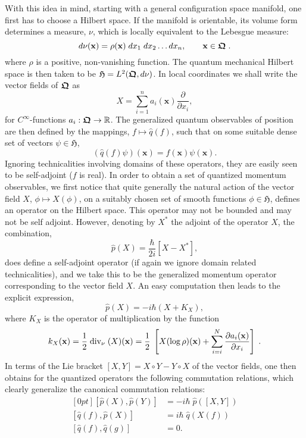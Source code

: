 \documentclass[12pt]{amsart}
\numberwithin{equation}{section}
\theoremstyle{remark}
\newcommand\HH{\mathfrak H}
\newcommand{\be}{\begin{equation}}
\newcommand{\en}{\end{equation}}
\newcommand{\bfrakQ}{\mbox{\boldmath $\mathfrak Q$}}
\newcommand{\bx}{\mathbf x}
\begin{document}
With this idea in mind, starting with a general configuration space manifold,
one first has to choose a Hilbert space. If the manifold is orientable, its
volume form determines a measure, $\nu$, which is locally equivalent to the
Lebesgue measure:
\be
   d\nu (\bx) = \rho (\bx)\; dx_1\;dx_2 \ldots dx_n ,
 \qquad \bx \in \bfrakQ \; . \label{volmeas}
\en
where $\rho$ is a positive, non-vanishing function. The quantum mechanical
Hilbert space is then taken to be $\HH = L^2 (\bfrakQ , d\nu )$.
In local coordinates we shall write the vector fields of $\bfrakQ$ as
$$ X = \sum_{i=1}^{n}a_i(\bx)\frac {\partial}{\partial x_i},   $$
for $C^{\infty}$-functions $a_i: \bfrakQ \rightarrow {\mathbb R}$.
The generalized quantum observables of position
are then defined by the mappings, $f \mapsto \widehat{q}(f)$,
such that on some  suitable dense set of vectors $\psi \in \HH$,
\be
     (\widehat{q}(f)\psi )(\bx) = f(\bx)\psi (\bx).
\label{quposops}
\en
Ignoring technicalities involving domains of these operators, they are easily
seen to be self-adjoint ($f$ is real). In order to obtain a set of quantized
momentum observables, we first notice that quite generally the natural action
of the vector field $X$, $\phi \mapsto X(\phi)$, on a suitably chosen set of
smooth functions $\phi \in \HH$, defines an operator on the Hilbert space. This
operator may not be bounded and may not be self adjoint. However, denoting by
$X^*$ the adjoint of the operator $X$, the combination,
\be
   \widehat{p}(X) = \frac \hbar{2i}[X - X^*],
\label{qumomops}
\en
does define a self-adjoint operator (if again we ignore domain related
technicalities), and we take this to be the generalized momentum operator
corresponding to the vector field $X$. An easy computation then leads to the
explicit expression,
\be
      \widehat{p}(X) = -i\hbar (X + K_{X}),
\label{segalquant1}
\en
where $K_X$ is the operator of multiplication by the function
\be
 k_X (\bx) = \frac 12\;\mbox{\rm div}_{\nu}\;(X)(\bx)
= \frac 12\;\left[X(\log \rho )(\bx) +
      \sum_{i=i}^N \frac {\partial a_i (\bx)}{\partial x_i}\right]\;.
  \label{segalquant2}
\en
In terms of the Lie bracket $[X,Y] = X\circ Y - Y\circ X$ of
the vector fields, one then obtains for the quantized operators the following
commutation relations, which clearly generalize the canonical commutation
relations:
\be \begin{aligned}[0pt]
[\widehat{p}(X), \widehat{p}(Y)]  &=  -i\hbar\; \widehat{p}([X,Y]) \\
[\widehat{q}(f), \widehat{p}(X)]  &=  i\hbar\; \widehat{q}(X(f)) \\
    [\widehat{q}(f), \widehat{q}(g)] &= 0.
\end{aligned}  \label{segalquant3} \en
\end{document}
